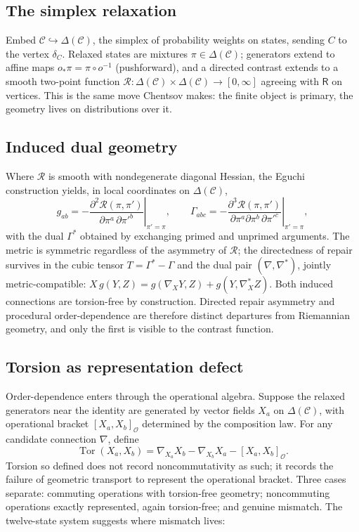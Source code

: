 \documentclass[11pt]{article}
\theoremstyle{remark}
\newcommand{\C}{\mathcal{C}}
\newcommand{\Ops}{\mathcal{O}}
\newcommand{\R}{\mathsf{R}}
\newcommand{\Tor}{\operatorname{Tor}}
\begin{document}
\subsection{The simplex relaxation}

Embed $\C \hookrightarrow \Delta(\C)$, the simplex of probability
weights on states, sending $C$ to the vertex $\delta_C$. Relaxed
states are mixtures $\pi\in\Delta(\C)$; generators extend to affine
maps $o_{*}\pi = \pi\circ o^{-1}$ (pushforward), and a directed
contrast extends to a smooth two-point function
$\mathcal{R}\colon \Delta(\C)\times\Delta(\C)\to[0,\infty]$ agreeing
with $\R$ on vertices. This is the same move Chentsov makes: the
finite object is primary, the geometry lives on distributions over it.

\subsection{Induced dual geometry}

Where $\mathcal{R}$ is smooth with nondegenerate diagonal Hessian, the
Eguchi construction \cite{amari} yields, in local coordinates on
$\Delta(\C)$,
\[
g_{ab} = -\left.\frac{\partial^{2}\mathcal{R}(\pi,\pi')}
{\partial \pi^{a}\,\partial \pi'^{b}}\right|_{\pi'=\pi},
\qquad
\Gamma_{abc} = -\left.\frac{\partial^{3}\mathcal{R}(\pi,\pi')}
{\partial \pi^{a}\partial \pi^{b}\,\partial \pi'^{c}}\right|_{\pi'=\pi},
\]
with the dual $\Gamma^{*}$ obtained by exchanging primed and unprimed
arguments. The metric is symmetric regardless of the asymmetry of
$\mathcal{R}$; the directedness of repair survives in the cubic
tensor $T = \Gamma^{*}-\Gamma$ and the dual pair
$(\nabla,\nabla^{*})$, jointly metric-compatible:
$X\,g(Y,Z) = g(\nabla_X Y, Z) + g(Y,\nabla^{*}_X Z)$. Both induced
connections are torsion-free by construction. Directed repair
asymmetry and procedural order-dependence are therefore distinct
departures from Riemannian geometry, and only the first is visible to
the contrast function.

\subsection{Torsion as representation defect}

Order-dependence enters through the operational algebra. Suppose the
relaxed generators near the identity are generated by vector fields
$X_{a}$ on $\Delta(\C)$, with operational bracket
$[X_{a},X_{b}]_{\Ops}$ determined by the composition law. For any
candidate connection $\nabla$, define
\[
\Tor(X_{a},X_{b})
= \nabla_{X_{a}}X_{b} - \nabla_{X_{b}}X_{a} - [X_{a},X_{b}]_{\Ops}.
\]
Torsion so defined does not record noncommutativity as such; it
records the failure of geometric transport to represent the
operational bracket. Three cases separate: commuting operations with
torsion-free geometry; noncommuting operations exactly represented,
again torsion-free; and genuine mismatch. The twelve-state system
suggests where mismatch lives:
\end{document}
